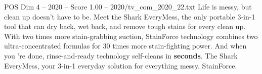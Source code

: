 \begin{textsample}{POS Dim 4 – 2020 – Score 1.00 – 2020/tv\_com\_2020\_22.txt}  \label{ex:f4_pos_049}
Life is messy, but clean up doesn't have to be.
Meet the Shark EveryMess, the only portable 3-in-1 tool that can dry back, wet back, and remove tough stains for every clean up.
With two times more stain-grabbing suction, StainForce technology combines two ultra-concentrated formulas for 30 times more stain-fighting power.
And when you 're done, rinse-and-ready technology self-cleans in \textbf{seconds}.
The Shark EveryMess, your 3-in-1 everyday solution for everything messy.
StainForce.

\end{textsample}
